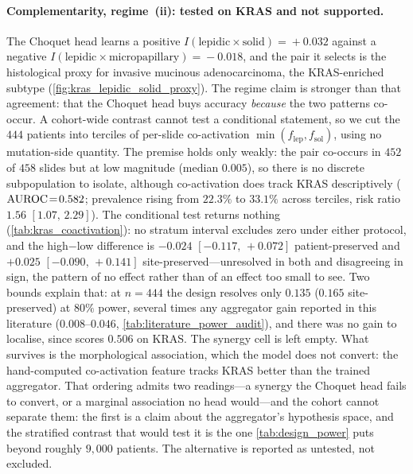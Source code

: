\paragraph{Complementarity, regime~(ii): tested on KRAS and not
supported.} The Choquet head learns a positive
$I(\text{lepidic}\!\times\!\text{solid})\!=\!{+}0.032$ against a negative
$I(\text{lepidic}\!\times\!\text{micropapillary})\!=\!-0.018$, and the
pair it selects is the histological proxy for invasive mucinous
adenocarcinoma, the KRAS-enriched
subtype\cite{rekhtman2013krassolid} (\cref{fig:kras_lepidic_solid_proxy}).
The regime claim is stronger than that agreement: that the Choquet head
buys accuracy \emph{because} the two patterns co-occur. A cohort-wide
contrast cannot test a conditional statement, so we cut the $444$
patients into terciles of per-slide co-activation
$\min(f_{\text{lep}}, f_{\text{sol}})$, using no mutation-side quantity.
The premise holds only weakly: the pair co-occurs in $452$ of $458$
slides but at low magnitude (median $0.005$), so there is no discrete
subpopulation to isolate, although co-activation does track KRAS
descriptively ($\text{AUROC}\!=\!0.582$; prevalence rising from $22.3\%$ to
$33.1\%$ across terciles, risk ratio $1.56$ $[1.07,\,2.29]$). The
conditional test returns nothing (\cref{tab:kras_coactivation}): no
stratum interval excludes zero under either protocol, and the
high${-}$low difference is $-0.024$ $[-0.117,\,{+}0.072]$
patient-preserved and ${+}0.025$ $[-0.090,\,{+}0.141]$
site-preserved---unresolved in both and disagreeing in sign, the
pattern of no effect rather than of an effect too small to see. Two
bounds explain that: at $n\!=\!444$ the design resolves only $0.135$
\auroc{} ($0.165$ site-preserved) at $80\%$ power, several times any
aggregator gain reported in this literature ($0.008$--$0.046$,
\cref{tab:literature_power_audit}), and there was no gain to localise,
since \fcmil{} scores $0.506$ on KRAS. The synergy cell is left empty.
What survives is the morphological association, which the model does
not convert: the hand-computed co-activation feature tracks KRAS better
than the trained aggregator. That ordering admits two readings---a
synergy the Choquet head fails to convert, or a marginal association no
head would---and the cohort cannot separate them: the first is a claim
about the aggregator's hypothesis space, and the stratified contrast
that would test it is the one \cref{tab:design_power} puts beyond
roughly $9{,}000$ patients. The alternative is reported as untested,
not excluded.

